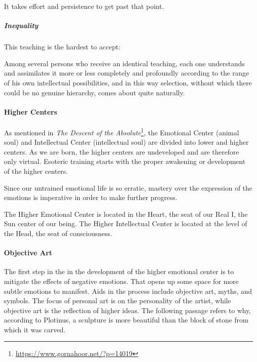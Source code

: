It takes effort and persistence to get past that point.

\subparagraph{Inequality}
This teaching is the hardest to accept:

\begin{quotex}
Among several persons who receive an identical teaching, each one understands and assimilates it more or less completely and profoundly according to the range of his own intellectual possibilities, and in this way selection, without which there could be no genuine hierarchy, comes about quite naturally. 

\end{quotex}
\paragraph{Higher Centers}
As mentioned in \textit{The Descent of the Absolute}\footnote{\url{https://www.gornahoor.net/?p=14019}}, the Emotional Center (animal soul) and Intellectual Center (intellectual soul) are divided into lower and higher centers. As we are born, the higher centers are undeveloped and are therefore only virtual. Esoteric training starts with the proper awakening or development of the higher centers.

Since our untrained emotional life is so erratic, mastery over the expression of the emotions is imperative in order to make further progress.

The Higher Emotional Center is located in the Heart, the seat of our Real I, the Sun center of our being. The Higher Intellectual Center is located at the level of the Head, the seat of consciousness.

\paragraph{Objective Art}
The first step in the in the development of the higher emotional center is to mitigate the effects of negative emotions. That opens up some space for more subtle emotions to manifest. Aids in the process include objective art, myths, and symbols. The focus of personal art is on the personality of the artist, while objective art is the reflection of higher ideas. The following passage refers to why, according to Plotinus, a sculpture is more beautiful than the block of stone from which it was carved.

